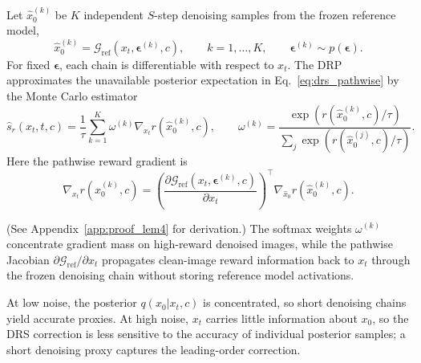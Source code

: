 \begin{proposition}
\label{prop:drp}
Let $\hat{x}_0^{(k)}$ be $K$ independent $S$-step denoising samples from the frozen reference model,
\begin{equation}
\hat{x}_0^{(k)}
=
\mathcal{G}_{\mathrm{ref}}(x_t,\boldsymbol{\epsilon}^{(k)},c),
\qquad
k=1,\ldots,K,
\qquad
\boldsymbol{\epsilon}^{(k)}\sim p(\boldsymbol{\epsilon}) .
\end{equation}
For fixed $\boldsymbol{\epsilon}$, each chain is differentiable with respect to $x_t$. The DRP approximates the unavailable posterior expectation in Eq.~\eqref{eq:drs_pathwise} by the Monte Carlo estimator
\begin{equation}
\widehat{s}_r(x_t,t,c)
=
\frac{1}{\tau}
\sum_{k=1}^K
\omega^{(k)}
\nabla_{x_t}r(\hat{x}_0^{(k)},c),
\qquad
\omega^{(k)}
=
\frac{\exp(r(\hat{x}_0^{(k)},c)/\tau)}
{\sum_j \exp(r(\hat{x}_0^{(j)},c)/\tau)} .
\label{eq:drp_estimator}
\end{equation}
Here the pathwise reward gradient is
\begin{equation}
\nabla_{x_t}r(\hat{x}_0^{(k)},c)
=
\left(
\frac{\partial \mathcal{G}_{\mathrm{ref}}(x_t,\boldsymbol{\epsilon}^{(k)},c)}
{\partial x_t}
\right)^{\!\top}
\nabla_{\hat{x}_0}r(\hat{x}_0^{(k)},c).
\end{equation}
\end{proposition}
(See Appendix~\ref{app:proof_lem4} for derivation.) The softmax weights $\omega^{(k)}$ concentrate gradient mass on high-reward denoised images, while the pathwise Jacobian $\partial\mathcal{G}_{\mathrm{ref}}/\partial x_t$ propagates clean-image reward information back to $x_t$ through the frozen denoising chain without storing reference model activations.

\begin{remark}
At low noise, the posterior $q(x_0|x_t,c)$ is concentrated, so short denoising chains yield accurate proxies. At high noise, $x_t$ carries little information about $x_0$, so the DRS correction is less sensitive to the accuracy of individual posterior samples; a short denoising proxy captures the leading-order correction.
\end{remark}

\vspace{-3mm}

